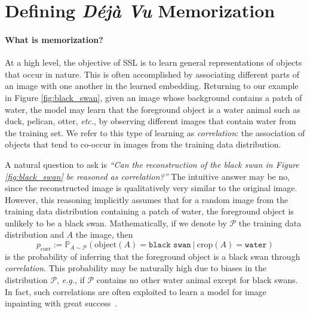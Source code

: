\section{Defining \emph{Déjà Vu} Memorization}
\label{sec:definition}

\paragraph{What is \dejavu memorization?} At a high level, the objective of SSL is to learn general representations of objects that occur in nature. This is often accomplished by associating different parts of an image with one another in the learned embedding. Returning to our example in Figure \ref{fig:black_swan}, given an image whose background contains a patch of water, the model may learn that the foreground object is a water animal such as duck, pelican, otter, \emph{etc.}, by observing different images that contain water from the training set. We refer to this type of learning as \emph{correlation}: the association of objects that tend to co-occur in images from the training data distribution.

A natural question to ask is \emph{``Can the reconstruction of the black swan in Figure \ref{fig:black_swan} be reasoned as correlation?''} The intuitive answer may be no, since the reconstructed image is qualitatively very similar to the original image. However, this reasoning implicitly assumes that for a random image from the training data distribution containing a patch of water, the foreground object is unlikely to be a black swan. Mathematically, if we denote by $\mathcal{P}$ the training data distribution and $A$ the image, then
\begin{equation*}
\label{eq:p_corr}
p_\text{corr} := \mathbb{P}_{A \sim \mathcal{P}}(\mathrm{object}(A) = \texttt{black swan} ~|~ \mathrm{crop}(A) = \texttt{water})
\end{equation*}
is the probability of inferring that the foreground object is a black swan through \emph{correlation}. This probability may be naturally high due to biases in the distribution $\mathcal{P}$, \emph{e.g.}, if $\mathcal{P}$ contains no other water animal except for black swans. In fact, such correlations are often exploited to learn a model for image inpainting with great success~\citep{yu2018generative, ulyanov2018deep}.

